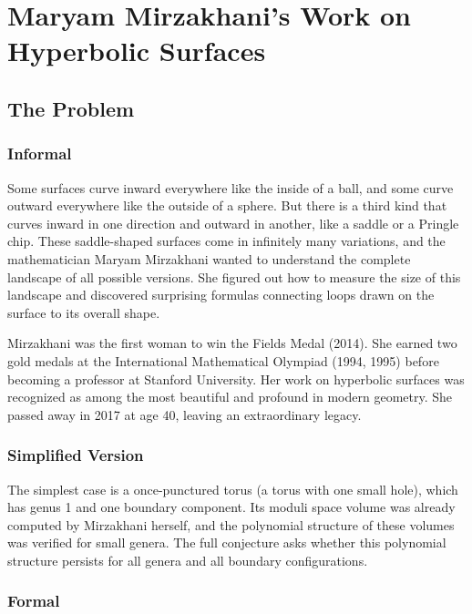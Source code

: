 \let\LocalMacro\relax

\chapter{Maryam Mirzakhani's Work on Hyperbolic Surfaces}

\section{The Problem}

\subsection{Informal}
Some surfaces curve inward everywhere like the inside of a ball, and some curve outward everywhere like the outside of a sphere. But there is a third kind that curves inward in one direction and outward in another, like a saddle or a Pringle chip. These saddle-shaped surfaces come in infinitely many variations, and the mathematician Maryam Mirzakhani wanted to understand the complete landscape of all possible versions. She figured out how to measure the size of this landscape and discovered surprising formulas connecting loops drawn on the surface to its overall shape.

\begin{historicalbox}
Mirzakhani was the first woman to win the Fields Medal (2014). She earned two gold medals at the International Mathematical Olympiad (1994, 1995) before becoming a professor at Stanford University. Her work on hyperbolic surfaces was recognized as among the most beautiful and profound in modern geometry. She passed away in 2017 at age 40, leaving an extraordinary legacy.
\end{historicalbox}

\subsection{Simplified Version}
The simplest case is a once-punctured torus (a torus with one small hole), which has genus 1 and one boundary component. Its moduli space volume was already computed by Mirzakhani herself, and the polynomial structure of these volumes was verified for small genera. The full conjecture asks whether this polynomial structure persists for all genera and all boundary configurations.

\subsection{Formal}

